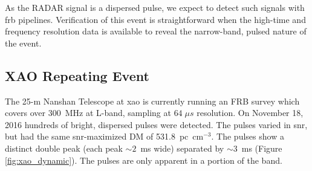 \documentclass[a4paper,fleqn,usenatbib]{mnras}
\begin{document}
As the RADAR signal is a dispersed pulse, we expect to detect such signals with
\gls{frb} pipelines.  Verification of this event is straightforward when the
high-time and frequency resolution data is available to reveal the narrow-band,
pulsed nature of the event.

\subsection{XAO Repeating Event}
\label{sec:xao_event}

%

The 25-m Nanshan Telescope at \gls{xao} is currently running an FRB survey which
covers over 300~MHz at L-band, sampling at $64 \; \mu s$ resolution. On November
18, 2016 hundreds of bright, dispersed pulses were detected. The pulses varied
in \gls{snr}, but had the same \gls{snr}-maximized DM of 531.8~pc~cm$^{-3}$. The
pulses show a distinct double peak (each peak $\sim 2$~ms wide) separated by
$\sim 3$~ms (Figure \ref{fig:xao_dynamic}). The pulses are only apparent in a
portion of the band.
\end{document}
